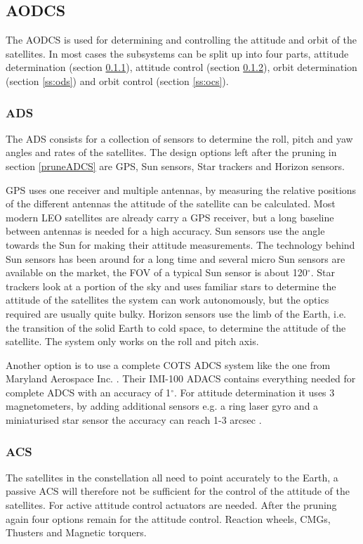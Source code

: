 \subsection{\ac{AODCS}}
The \ac{AODCS} is used for determining and controlling the attitude and orbit of the satellites. In most cases the subsystems can be split up into four parts, attitude determination (section \ref{ss:ads}), attitude control (section \ref{ss:acs}), orbit determination (section \ref{ss:ods}) and orbit control (section \ref{ss:ocs}). 
\subsubsection{\ac{ADS}}
\label{ss:ads}
The \ac{ADS} consists for a collection of sensors to determine the roll, pitch and yaw angles and rates of the satellites. The design options left after the pruning in section \ref{pruneADCS} are \ac{GPS}, Sun sensors, Star trackers and Horizon sensors. 

\ac{GPS} uses one receiver and multiple antennas, by measuring the relative positions of the different antennas the attitude of the satellite can be calculated. Most modern \ac{LEO} satellites are already carry a \ac{GPS} receiver, but a long baseline between antennas is needed for a high accuracy. 
Sun sensors use the angle towards the Sun for making their attitude measurements. The technology behind Sun sensors has been around for a long time and several micro Sun sensors are available on the market, the \ac{FOV} of a typical Sun sensor is about 120${}^{\circ}$. 
Star trackers look at a portion of the sky and uses familiar stars to determine the attitude of the satellites the system can work autonomously, but the optics required are usually quite bulky. 
Horizon sensors use the limb of the Earth, i.e. the transition of the solid Earth to cold space, to determine the attitude of the satellite. The system only works on the roll and pitch axis.

Another option is to use a complete \ac{COTS} \ac{ADCS} system like the one from Maryland Aerospace Inc. \cite{maryland}. Their IMI-100 ADACS contains everything needed for complete \ac{ADCS} with an accuracy of 1${}^\circ$. For attitude determination it uses 3 magnetometers, by adding additional sensors e.g. a ring laser gyro and a miniaturised star sensor the accuracy can reach 1-3 arcsec \cite{imi100}.

\subsubsection{\ac{ACS}}
\label{ss:acs}
The satellites in the constellation all need to point accurately to the Earth, a passive \ac{ACS} will therefore not be sufficient for the control of the attitude of the satellites. For active attitude control actuators are needed. After the pruning again four options remain for the attitude control. Reaction wheels, \acp{CMG}, Thusters and Magnetic torquers.

